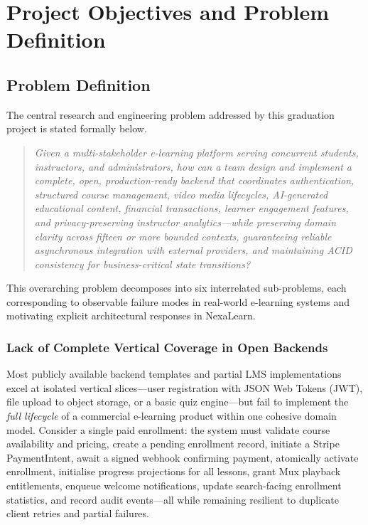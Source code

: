 
\section{Project Objectives and Problem Definition}
\label{sec:problem-objectives}

\subsection{Problem Definition}
\label{subsec:problem-definition}

The central research and engineering problem addressed by this graduation project is stated formally below.

\begin{quote}
\textit{Given a multi-stakeholder e-learning platform serving concurrent students, instructors, and administrators, how can a team design and implement a complete, open, production-ready backend that coordinates authentication, structured course management, video media lifecycles, AI-generated educational content, financial transactions, learner engagement features, and privacy-preserving instructor analytics---while preserving domain clarity across fifteen or more bounded contexts, guaranteeing reliable asynchronous integration with external providers, and maintaining ACID consistency for business-critical state transitions?}
\end{quote}

This overarching problem decomposes into six interrelated sub-problems, each corresponding to observable failure modes in real-world e-learning systems and motivating explicit architectural responses in NexaLearn.

\subsubsection{Lack of Complete Vertical Coverage in Open Backends}
\label{subsubsec:vertical-coverage}

Most publicly available backend templates and partial LMS implementations excel at isolated vertical slices---user registration with JSON Web Tokens (JWT), file upload to object storage, or a basic quiz engine---but fail to implement the \textit{full lifecycle} of a commercial e-learning product within one cohesive domain model. Consider a single paid enrollment: the system must validate course availability and pricing, create a pending enrollment record, initiate a Stripe PaymentIntent, await a signed webhook confirming payment, atomically activate enrollment, initialise progress projections for all lessons, grant Mux playback entitlements, enqueue welcome notifications, update search-facing enrollment statistics, and record audit events---all while remaining resilient to duplicate client retries and partial failures.

